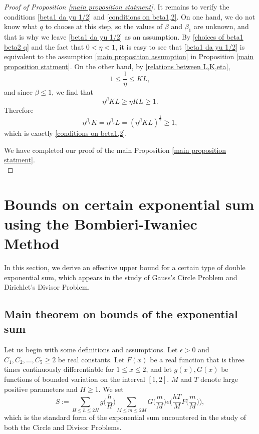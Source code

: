 \documentclass[11pt]{amsart}
\numberwithin{equation}{section}
\theoremstyle{definition}
\theoremstyle{proposition}
\begin{document}
\begin{proof}  [Proof of Proposition \ref{main proposition statment}]
It remains to verify the conditions \eqref{beta1 da yu 1/2} and \eqref{conditions on beta1,2}. On one hand, we do not know what $q$ to choose at this step, so the values of $\beta$ and $\beta_1$ are unknown, and that is why we leave \eqref{beta1 da yu 1/2} as an assumption. By \eqref{choices of beta1 beta2 q} and the fact that $0<\eta<1$, it is easy to see that \eqref{beta1 da yu 1/2} is equivalent to the assumption \eqref{main proposition assumption} in Proposition \ref{main proposition statment}. 
On the other hand, by \eqref{relations between L,K,eta}, 
\[
1\le \frac{1}{\eta} \le KL,
\]
and since $\beta \le 1$, we find that
\[
\eta^\beta KL \ge \eta KL \ge 1.
\]
Therefore
\[
\eta^{\beta_1}K=\eta^{\beta_2}L=(\eta^\beta KL)^{\frac{1}{2}}\ge 1,
\]
which is exactly \eqref{conditions on beta1,2}. 

We have completed our proof of the main Proposition \ref{main proposition statment}.\\
\end{proof}

\section{Bounds on certain exponential sum using the Bombieri-Iwaniec Method}\label{bounds on exponential sum}

In this section, we derive an effective upper bound for a certain type of double exponential sum, which appears in the study of Gauss's Circle Problem and Dirichlet's Divisor Problem. \\

\subsection{Main theorem on bounds of the exponential sum}
Let us begin with some definitions and assumptions. Let $\epsilon>0$ and $C_1,C_2,\dots,C_5\ge 2$ be real constants. Let $F(x)$ be a real function that is three times continuously differentiable for $1\le x\le 2$, and let $g(x),G(x)$ be functions of bounded variation on the interval $[1,2]$. $M$ and $T$ denote large positive parameters and $H\ge 1$.  We set  
\begin{equation}  \label{definition of S}
S :=\sum_{H\le h\le 2H} g\Big(\frac{h}{H}\Big) \sum_{M\le m\le 2M} G\Big(\frac{m}{M}\Big)e\Big(\frac{hT}{M}F\Big(\frac{m}{M}\Big)\Big),
\end{equation}
which is the standard form of the exponential sum encountered in the study of both the Circle and Divisor Problems. \\
\end{document}
